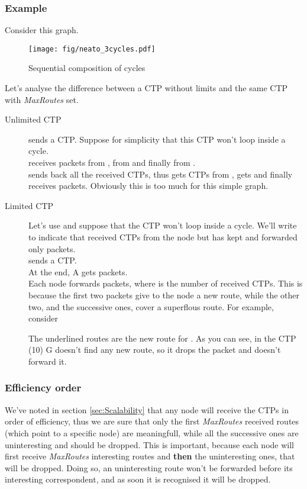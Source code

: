 \documentclass[a4paper]{article}
\begin{document}
\subsubsection*{Example}
Consider this graph.
\begin{figure}[h]
	\begin{center}
		\texttt{[image: fig/neato\_3cycles.pdf]}
	\end{center}
	\caption{Sequential composition of cycles}
	\label{fig:q2_scalability_example}
\end{figure}
Let's analyse the difference between a CTP without limits and the same CTP
with \emph{MaxRoutes} set.
\begin{description}
	\item[Unlimited CTP]  sends a CTP. Suppose for simplicity that
		this CTP won't loop inside a cycle.\\
		 receives  packets from ,   from  and
		finally   from .\\
		 sends back all the received CTPs, thus  gets  CTPs
		from ,  gets  and finally  receives 
		packets.
		Obviously this is too much for this simple graph.
	\item[Limited CTP] Let's use  and suppose
		that the CTP won't loop inside a cycle. We'll write
		 to indicate that  received  CTPs from the node
		 but has kept and forwarded only  packets.\\
		 sends a CTP.\\
		
		At the end, A gets  packets.\\
		Each node forwards  packets, where  is the number of
		received CTPs. This is because the first two packets give to
		the node a new route, while the other two, and the successive
		ones, cover a superflous route. For example, consider
		
		The underlined routes are the new route for . As you can
		see, in the CTP (10) G doesn't find any new route, so
		it drops the packet and doesn't forward it.
	\end{description}

\subsubsection{Efficiency order}
\label{sec:eff_order}

We've noted in section \ref{sec:Scalability} that any node will receive the
CTPs in order of efficiency, thus we are sure that only the first
\emph{MaxRoutes} received routes (which point to a specific node) are
meaningfull, while all the successive ones are uninteresting and should be
dropped. This is important, because each
node will first receive \emph{MaxRoutes} interesting routes and
\textbf{then} the uninteresting ones, that will be dropped. 
Doing so, an uninteresting route won't be forwarded before its interesting
correspondent, and as soon it is recognised it will be dropped.
\end{document}

